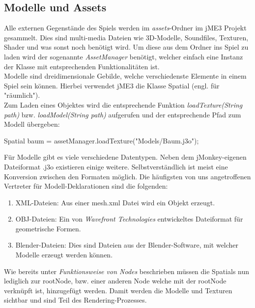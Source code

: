 \subsection{Modelle und Assets}
Alle externen Gegenstände des Spiels werden im \emph{assets}-Ordner im jME3 Projekt gesammelt. Dies sind multi-media Dateien wie 3D-Modelle, Soundfiles, Texturen, Shader und was sonst noch benötigt wird.
Um diese aus dem Ordner ins Spiel zu laden wird der sogenannte \emph{AssetManager} benötigt, welcher einfach eine Instanz der Klasse mit entsprechenden Funktionalitäten ist. \\Modelle sind dreidimensionale Gebilde, welche verschiedenste Elemente in einem Spiel sein können. Hierbei verwendet jME3 die Klasse Spatial (engl. für "räumlich"). \\Zum Laden eines Objektes wird die entsprechende Funktion \emph{loadTexture(String path)} bzw. \emph{loadModel(String path)} aufgerufen und der entsprechende Pfad zum Modell übergeben:
\begin{center}
{Spatial baum = assetManager.loadTexture("Models/Baum.j3o");}
\end{center} Für Modelle gibt es viele verschiedene Datentypen. Neben dem jMonkey-eigenen Dateiformat .j3o existieren einige weitere. Selbstverständlich ist meist eine Konversion zwischen den Formaten möglich. Die häufigsten von uns angetroffenen Vertreter für Modell-Deklarationen sind die folgenden:
\begin{enumerate}
	\item XML-Dateien: Aus einer mesh.xml Datei wird ein Objekt erzeugt. 
	\item OBJ-Dateien: Ein von \emph{Wavefront Technologies} entwickeltes Dateiformat für geometrische Formen. \cite{OBJ1}
	\item Blender-Dateien: Dies sind Dateien aus der Blender-Software, mit welcher Modelle erzeugt werden können.
\end{enumerate} Wie bereits unter \emph{Funktionsweise von Nodes} beschrieben müssen die Spatials nun lediglich zur rootNode, bzw. einer anderen Node welche mit der rootNode verknüpft ist, hinzugefügt werden. Damit werden die Modelle und Texturen sichtbar und sind Teil des Rendering-Prozesses.


